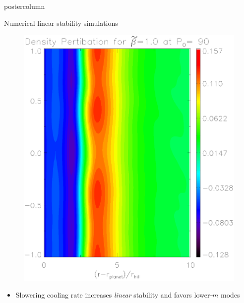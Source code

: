 \documentclass[final,hyperref={pdfpagelabels=false}]{beamer}
\begin{document}
\begin{frame}
\begin{columns}
\begin{column}{.49\textwidth}
\begin{beamercolorbox}[center,wd=\textwidth]{postercolumn}
\begin{minipage}[T]{.95\textwidth}
{\begin{block}{{\Large Numerical linear stability simulations}}
\begin{minipage}[t]{0.49\textwidth}
\begin{figure}
                        \includegraphics[width=.95\textwidth,clip=false,trim=0cm
                        0cm .1cm 0cm]{Posterfig_medb}
                      \end{figure}
                    \end{minipage}    
                    \begin{itemize}
                    \item Slowering cooling rate increases
                      \emph{linear} stability and favors lower-$m$ modes
                    \end{itemize}

\end{block}}
\end{minipage}
\end{beamercolorbox}
\end{column}
\end{columns}
\end{frame}
\end{document}
